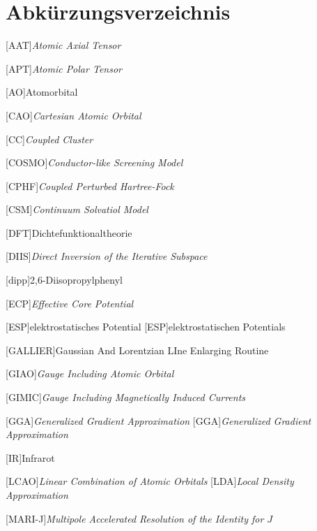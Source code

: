  {}
\renewcommand\refname{Abkürzungsverzeichnis} \chapter*{Abkürzungsverzeichnis}
\begin{acronym}[SEPSEP] %
    \setlength{\itemsep}{0.2cm} %
    
    [AAT]{\textit{Atomic Axial Tensor}}
    
    [APT]{\textit{Atomic Polar Tensor}}
    
    [AO]{Atomorbital}
	
	[CAO]{\textit{Cartesian Atomic Orbital}}
		
    [CC]{\textit{Coupled Cluster}}		
		
 	[COSMO]{\textit{Conductor-like Screening Model}}
 	
	[CPHF]{\textit{Coupled Perturbed Hartree-Fock}}
	
	[CSM]{\textit{Continuum Solvatiol Model}}
 	
    [DFT]{Dichtefunktionaltheorie}
    
    [DIIS]{\textit{Direct Inversion of the Iterative Subspace}}
    
    [dipp]{2,6-Diisopropylphenyl}
    
    [ECP]{\textit{Effective Core Potential}}
    
    [ESP]{elektrostatisches Potential}
	    [ESP]{elektrostatischen Potentials}

	[GALLIER]{Gaussian And Lorentzian LIne Enlarging Routine}
	
	[GIAO]{\textit{Gauge Including Atomic Orbital}}   
	
	[GIMIC]{\textit{Gauge Including Magnetically Induced Currents}} 

	[GGA]{\textit{Generalized Gradient Approximation}}   
		[GGA]{\textit{Generalized Gradient Approximation}}
	
	[IR]{Infrarot}
		
	[LCAO]{\textit{Linear Combination of Atomic Orbitals}}
	[LDA]{\textit{Local Density Approximation}}
     
    [MARI-J]{\textit{Multipole Accelerated Resolution of the Identity for $J$}} 	
 	

\end{acronym}
